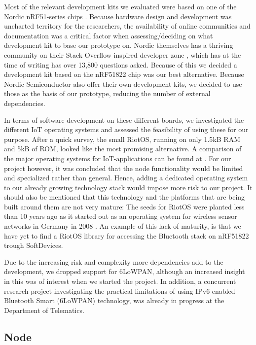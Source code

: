 Most of the relevant development kits we evaluated were based on one of the Nordic nRF51-series chips \cite{newRef_36, newRef_36_2}. Because hardware design and development was uncharted territory for the researchers, the availability of online communities and documentation was a critical factor when assessing/deciding on what development kit to base our prototype on. Nordic themselves has a thriving community on their Stack Overflow inspired developer zone \cite{newRef_50}, which has at the time of writing has over 13,800 questions asked. Because of this we decided a development kit based on the  nRF51822 chip was our best alternative. Because Nordic Semiconductor also offer their own development kits, we decided to use those as the basis of our prototype, reducing the number of external dependencies. 

In terms of software development on these different boards, we investigated the different IoT operating systems and assessed the feasibility of using these for our purpose. After a quick survey, the small RiotOS, running on only 1.5kB RAM and 5kB of ROM, looked like the most promising alternative. A comparison of the major operating systems for IoT-applications can be found at \cite{Anonymous:a1din1ZK}. For our project however, it was concluded that the node functionality would be limited and specialized rather than general. Hence, adding a dedicated operating system to our already growing technology stack would impose more risk to our project. It should also be mentioned that this technology and the platforms that are being built around them are not very mature: The seeds for RiotOS were planted less than 10 years ago as it started out as an operating system for wireless sensor networks in Germany in 2008 \cite{newRef_52}. An example of this lack of maturity, is that we have yet to find a RiotOS library for accessing the Bluetooth stack on nRF51822 trough SoftDevices.

Due to the increasing risk and complexity more dependencies add to the development, we dropped support for 6LoWPAN, although an increased insight in this was of interest when we started the project. In addition, a concurrent research project investigating the practical limitations of using IPv6 enabled Bluetooth Smart (6LoWPAN) technology, was already in progress at the Department of Telematics.


\subsection{Node} %
\label{sub:node}

